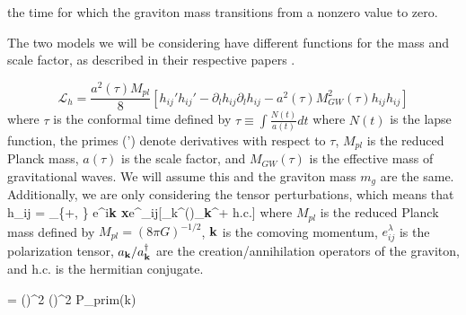 the time for which the graviton mass transitions from a nonzero value to zero.

The two models we will be considering have different functions for the mass and scale factor, as described in their respective papers \cite{Gumrukcuoglu:2012, Fujita:2018}. 

\begin{equation}\label{eqn:1}
    \mathcal{L}_h = \frac{a^2(\tau)M_{pl}}{8}[h_{ij}' h_{ij}' - \partial_lh_{ij}\partial_l h_{ij} - a^2(\tau)M_{GW}^2(\tau)h_{ij}h_{ij}]
\end{equation}
where $\tau$ is the conformal time defined by $\tau \equiv \int \frac{N(t)}{a(t)}dt$ where $N(t)$ is the lapse function, the primes (') denote derivatives with respect to $\tau$, $M_{pl}$ is the reduced Planck mass, $a(\tau)$ is the scale factor, and $M_{GW}(\tau)$ is the effective mass of gravitational waves. We will assume this and the graviton mass $m_g$ are the same. Additionally, we are only considering the tensor perturbations, which means that 
h_{ij} = \sum_{\lambda \in \{+, \times\}} \int {}e^{i{\bf k \cdot x}}e^\lambda_{ij}[\gamma_k^\lambda(\tau)_{\bf k}^\lambda + \mbox{h.c.}] where $M_{pl}$ is the reduced Planck mass defined by $M_{pl} = (8\pi G)^{-1/2}$, ${\bf k}$ is the comoving momentum, $e^\lambda_{ij}$ is the polarization tensor, $a_{\bf k} / a_{\bf k}^\dagger$ are the creation/annihilation operators of the graviton, and h.c. is the hermitian conjugate. 


= \left(\right)^2 \left(\right)^2  P_{prim}(k) \\


